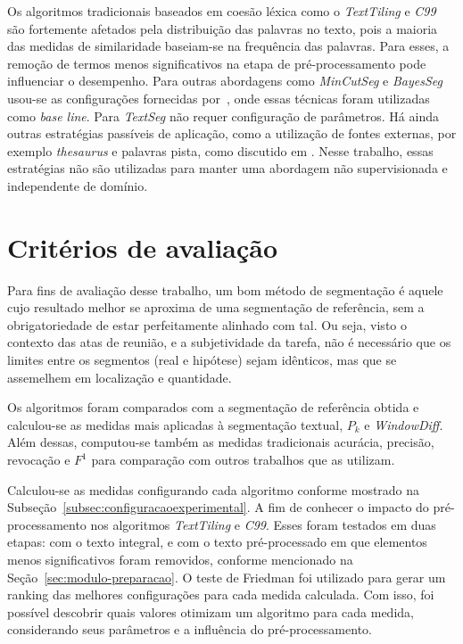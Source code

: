 Os algoritmos tradicionais baseados em coesão léxica como o \textit{TextTiling} e \textit{C99} são fortemente afetados pela distribuição das palavras no texto, pois a maioria das medidas de similaridade baseiam-se na frequência das palavras. Para esses, a remoção de termos menos significativos na etapa de pré-processamento pode influenciar o desempenho. Para outras abordagens como \textit{MinCutSeg} e \textit{BayesSeg} usou-se as configurações fornecidas por~\cite{Eis2008}, onde essas técnicas foram utilizadas como \textit{base line}. Para \textit{TextSeg} não requer configuração de parâmetros.
Há ainda outras estratégias passíveis de aplicação, como a utilização de fontes externas, por exemplo \textit{thesaurus} e palavras pista, como discutido em \cite{Naili2016, Gutierrez2016, Ferret2009}. Nesse trabalho, essas estratégias não são utilizadas para manter uma abordagem não supervisionada e independente de domínio. 
	

\section{Critérios de avaliação}

Para fins de avaliação desse trabalho, um bom método de segmentação é aquele cujo resultado melhor se aproxima de uma segmentação de referência, sem a obrigatoriedade de estar perfeitamente alinhado com tal. Ou seja, visto o contexto das atas de reunião, e a subjetividade da tarefa, não é necessário que os limites entre os segmentos (real e hipótese) sejam idênticos, mas que se assemelhem em localização e quantidade.

Os algoritmos foram comparados com a segmentação de referência obtida e calculou-se as medidas mais aplicadas à segmentação textual, $P_k$ e \textit{WindowDiff}. Além dessas, computou-se também as medidas tradicionais acurácia, precisão, revocação e $F^1$ para comparação com outros trabalhos que as utilizam.

Calculou-se as medidas configurando cada algoritmo conforme mostrado na Subseção~\ref{subsec:configuracaoexperimental}.  
A fim de conhecer o impacto do pré-processamento nos algoritmos \textit{TextTiling} e \textit{C99}. Esses foram testados em duas etapas: com o texto integral, e com o texto pré-processado em que elementos menos significativos foram removidos, conforme mencionado na Seção~\ref{sec:modulo-preparacao}.  
O teste de Friedman foi utilizado para gerar um ranking das melhores configurações para cada medida calculada. Com isso, foi possível descobrir quais valores otimizam um algoritmo para cada medida, considerando seus parâmetros e a influência do pré-processamento. 
 
